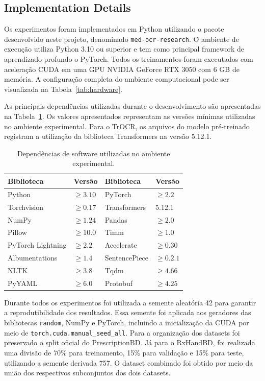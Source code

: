 \documentclass[11pt,a4paper]{article}
\begin{document}
\subsection{Implementation Details}
\label{sec:implementation}

Os experimentos foram implementados em Python utilizando o pacote desenvolvido
neste projeto, denominado \texttt{med-ocr-research}. O ambiente de execução
utiliza Python 3.10 ou superior e tem como principal framework de aprendizado
profundo o PyTorch. Todos os treinamentos foram executados com aceleração CUDA
em uma GPU NVIDIA GeForce RTX 3050 com 6 GB de memória. A configuração completa
do ambiente computacional pode ser visualizada na
Tabela~\ref{tab:hardware}.

As principais dependências utilizadas durante o desenvolvimento são
apresentadas na Tabela~\ref{tab:software}. Os valores apresentados representam
as versões mínimas utilizadas no ambiente experimental. Para o TrOCR, os
arquivos do modelo pré-treinado registram a utilização da biblioteca
Transformers na versão 5.12.1.

\begin{table}[htbp]
	\centering
	\caption{Dependências de software utilizadas no ambiente experimental.}
	\label{tab:software}
	\begin{tabular}{llll}
		\toprule
		\textbf{Biblioteca} & \textbf{Versão} &
		\textbf{Biblioteca} & \textbf{Versão} \\
		\midrule
		Python            & $\geq 3.10$   & PyTorch          & $\geq 2.2$  \\
		Torchvision       & $\geq 0.17$   & Transformers     & 5.12.1       \\
		NumPy             & $\geq 1.24$   & Pandas           & $\geq 2.0$  \\
		Pillow            & $\geq 10.0$   & Timm             & $\geq 1.0$  \\
		PyTorch Lightning & $\geq 2.2$    & Accelerate       & $\geq 0.30$ \\
		Albumentations    & $\geq 1.4$    & SentencePiece    & $\geq 0.2.1$ \\
		NLTK              & $\geq 3.8$    & Tqdm             & $\geq 4.66$ \\
		PyYAML            & $\geq 6.0$    & Protobuf         & $\geq 4.25$ \\
		\bottomrule
	\end{tabular}
\end{table}

Durante todos os experimentos foi utilizada a semente aleatória 42 para garantir
a reprodutibilidade dos resultados. Essa semente foi aplicada aos geradores das
bibliotecas \texttt{random}, NumPy e PyTorch, incluindo a inicialização da CUDA
por meio de \texttt{torch.cuda.manual\_seed\_all}. Para a organização dos
datasets foi preservado o split oficial do PrescriptionBD. Já para o RxHandBD,
foi realizada uma divisão de 70\% para treinamento, 15\% para validação e 15\%
para teste, utilizando a semente derivada 757. O dataset combinado foi obtido
por meio da união dos respectivos subconjuntos dos dois datasets.
\end{document}
